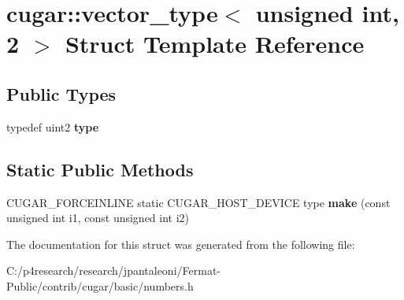 \hypertarget{structcugar_1_1vector__type_3_01unsigned_01int_00_012_01_4}{}\section{cugar\+:\+:vector\+\_\+type$<$ unsigned int, 2 $>$ Struct Template Reference}
\label{structcugar_1_1vector__type_3_01unsigned_01int_00_012_01_4}
\subsection*{Public Types}
\begin{DoxyCompactItemize}
\item 
\mbox{\label{structcugar_1_1vector__type_3_01unsigned_01int_00_012_01_4_a8c9185a556d0cb65dda4e8617cdbab91}} 
typedef uint2 {\bfseries type}
\end{DoxyCompactItemize}
\subsection*{Static Public Methods}
\begin{DoxyCompactItemize}
\item 
\mbox{\label{structcugar_1_1vector__type_3_01unsigned_01int_00_012_01_4_a5ad75bf1d9efb5ca37748298f08bc528}} 
C\+U\+G\+A\+R\+\_\+\+F\+O\+R\+C\+E\+I\+N\+L\+I\+NE static C\+U\+G\+A\+R\+\_\+\+H\+O\+S\+T\+\_\+\+D\+E\+V\+I\+CE type {\bfseries make} (const unsigned int i1, const unsigned int i2)
\end{DoxyCompactItemize}


The documentation for this struct was generated from the following file\+:\begin{DoxyCompactItemize}
\item 
C\+:/p4research/research/jpantaleoni/\+Fermat-\/\+Public/contrib/cugar/basic/numbers.\+h\end{DoxyCompactItemize}
